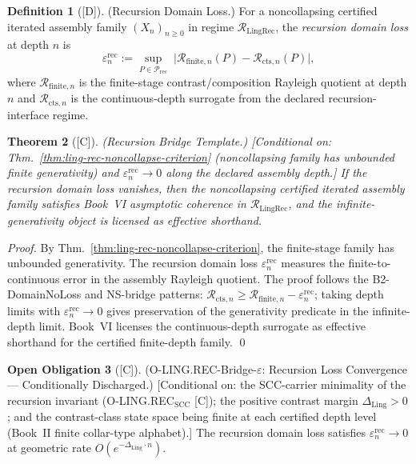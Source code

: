 \documentclass[12pt,oneside]{amsbook}
\theoremstyle{plain}
\newtheorem{theorem}{Theorem}[section]
\theoremstyle{definition}
\newtheorem{definition}[theorem]{Definition}
\newtheorem{obligation}[theorem]{Open Obligation}
\theoremstyle{remark}
\newcommand{\status}[1]{\textup{[#1]}}
\begin{document}
\begin{definition}[\status{D}]\label{def:ling-recursion-domain-loss}
\textup{(Recursion Domain Loss.)}
For a noncollapsing certified iterated assembly family
$(X_n)_{n\ge0}$ in regime $\mathcal{R}_{\mathrm{LingRec}}$,
the \emph{recursion domain loss} at depth $n$ is
\[
 \varepsilon_n^{\mathrm{rec}} :=
 \sup_{P \in \mathcal{P}_{\mathrm{rec}}}\;
 \bigl|
 \mathcal{R}_{\mathrm{finite},n}(P)
 - \mathcal{R}_{\mathrm{cts},n}(P)
 \bigr|,
\]
where $\mathcal{R}_{\mathrm{finite},n}$ is the finite-stage
contrast/composition Rayleigh quotient at depth $n$ and
$\mathcal{R}_{\mathrm{cts},n}$ is the continuous-depth surrogate
from the declared recursion-interface regime.
\end{definition}

\begin{theorem}[\status{C}]\label{thm:ling-rec-bridge-template}
\textup{(Recursion Bridge Template.)}
\textup{[Conditional on: Thm.~\ref{thm:ling-rec-noncollapse-criterion}
(noncollapsing family has unbounded finite generativity) and
$\varepsilon_n^{\mathrm{rec}} \to 0$ along the declared assembly
depth.]}
If the recursion domain loss vanishes, then the noncollapsing
certified iterated assembly family satisfies Book~VI asymptotic
coherence in $\mathcal{R}_{\mathrm{LingRec}}$, and the
infinite-generativity object is licensed as effective shorthand.
\end{theorem}

\begin{proof}
By Thm.~\ref{thm:ling-rec-noncollapse-criterion}, the finite-stage
family has unbounded generativity. The recursion domain loss
$\varepsilon_n^{\mathrm{rec}}$ measures the finite-to-continuous
error in the assembly Rayleigh quotient. The proof follows the
B2-DomainNoLoss and NS-bridge patterns: $\mathcal{R}_{\mathrm{cts},n}
\ge \mathcal{R}_{\mathrm{finite},n} - \varepsilon_n^{\mathrm{rec}}$;
taking depth limits with $\varepsilon_n^{\mathrm{rec}} \to 0$ gives
preservation of the generativity predicate in the infinite-depth
limit. Book~VI licenses the continuous-depth surrogate as effective
shorthand for the certified finite-depth family.
\qed
\end{proof}

\begin{obligation}[\status{C}]\label{ob:ling-rec-bridge-eps}
\textup{(O-LING.REC-Bridge-$\varepsilon$: Recursion Loss Convergence ---
Conditionally Discharged.)}
\textup{[Conditional on: the SCC-carrier minimality of the recursion
invariant (O-LING.REC$_{\mathrm{SCC}}$ [C]); the positive contrast
margin $\Delta_{\mathrm{Ling}} > 0$; and the contrast-class state
space being finite at each certified depth level (Book~II finite
collar-type alphabet).]}
The recursion domain loss satisfies
$\varepsilon_n^{\mathrm{rec}} \to 0$ at geometric rate
$O(e^{-\Delta_{\mathrm{Ling}} \cdot n})$.
\end{obligation}
\end{document}
